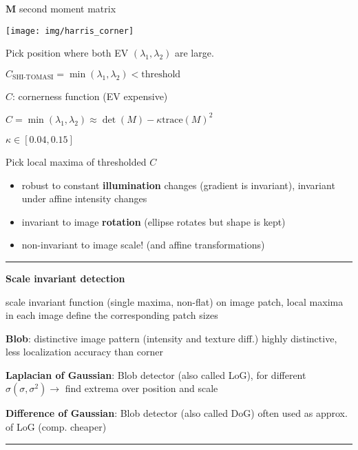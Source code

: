 \documentclass[fontsize=6pt]{scrartcl}
\newcommand{\mat}[1]{\mathbf{#1}}
\begin{document}
\begin{multicols*}{4}
$\mat M$ second moment matrix

\begin{minipage}{0.35\linewidth}
	\texttt{[image: img/harris\_corner]}
\end{minipage}
\begin{minipage}{0.65\linewidth}
	Pick position where both EV $(\lambda_1, \lambda_2)$ are large.
	
	$C_{\text{SHI-TOMASI}} =\min(\lambda_1, \lambda_2) < \text{threshold}$
	
	$C$: cornerness  function (EV expensive)
	
	$ C = \min(\lambda_1, \lambda_2) \approx \det(M) - \kappa \text{trace}(M)^2$
	
	$ \kappa \in [0.04, 0.15]$
	
	Pick local maxima of thresholded $C$
\end{minipage}

\begin{itemize}
\item robust to constant \textbf{illumination} changes (gradient is invariant), invariant under affine intensity changes
\item invariant to image \textbf{rotation} (ellipse rotates but shape is kept)
\item non-invariant to image scale! (and affine transformations)
\end{itemize}

\hrule
\vspace{4pt}

\textbf{Scale invariant detection}

scale invariant function (single maxima, non-flat) on image patch, local maxima in each image define the corresponding patch sizes

\textbf{Blob}: distinctive image pattern (intensity and texture diff.) highly distinctive, less localization accuracy than corner

\textbf{Laplacian of Gaussian}:	Blob detector (also called LoG),	for different $\sigma (\sigma, \sigma^2) \rightarrow$ find extrema over position and scale

\textbf{Difference of Gaussian}: Blob detector (also called DoG) often used as approx. of LoG (comp. cheaper)

\hrule
\vspace{4pt}


\end{multicols*}
\end{document}
